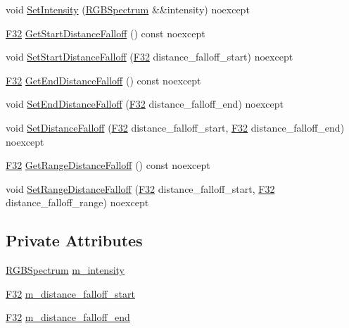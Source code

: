 \begin{DoxyCompactItemize}
void \hyperlink{structmage_1_1_scene_fog_aa953b6e08e2f6bcecfbb906959e876ea}{Set\+Intensity} (\hyperlink{structmage_1_1_r_g_b_spectrum}{R\+G\+B\+Spectrum} \&\&intensity) noexcept
\item 
\hyperlink{namespacemage_aa97e833b45f06d60a0a9c4fc22ae02c0}{F32} \hyperlink{structmage_1_1_scene_fog_a5cbed5d7f50485646d825289369bddfa}{Get\+Start\+Distance\+Falloff} () const noexcept
\item 
void \hyperlink{structmage_1_1_scene_fog_a0715b592a11b5705ad510cb6641cc5f6}{Set\+Start\+Distance\+Falloff} (\hyperlink{namespacemage_aa97e833b45f06d60a0a9c4fc22ae02c0}{F32} distance\+\_\+falloff\+\_\+start) noexcept
\item 
\hyperlink{namespacemage_aa97e833b45f06d60a0a9c4fc22ae02c0}{F32} \hyperlink{structmage_1_1_scene_fog_a312d19b9e3217c4aae6b9d2c831c860a}{Get\+End\+Distance\+Falloff} () const noexcept
\item 
void \hyperlink{structmage_1_1_scene_fog_a2e2923d38883d387e3c288d943aacd84}{Set\+End\+Distance\+Falloff} (\hyperlink{namespacemage_aa97e833b45f06d60a0a9c4fc22ae02c0}{F32} distance\+\_\+falloff\+\_\+end) noexcept
\item 
void \hyperlink{structmage_1_1_scene_fog_ae8db22af101cebabd670e37b3fb62662}{Set\+Distance\+Falloff} (\hyperlink{namespacemage_aa97e833b45f06d60a0a9c4fc22ae02c0}{F32} distance\+\_\+falloff\+\_\+start, \hyperlink{namespacemage_aa97e833b45f06d60a0a9c4fc22ae02c0}{F32} distance\+\_\+falloff\+\_\+end) noexcept
\item 
\hyperlink{namespacemage_aa97e833b45f06d60a0a9c4fc22ae02c0}{F32} \hyperlink{structmage_1_1_scene_fog_a8085b84b90e907751a0db99f9a26a3ef}{Get\+Range\+Distance\+Falloff} () const noexcept
\item 
void \hyperlink{structmage_1_1_scene_fog_acd555c5cbb592c2e78ae168bbb39da6c}{Set\+Range\+Distance\+Falloff} (\hyperlink{namespacemage_aa97e833b45f06d60a0a9c4fc22ae02c0}{F32} distance\+\_\+falloff\+\_\+start, \hyperlink{namespacemage_aa97e833b45f06d60a0a9c4fc22ae02c0}{F32} distance\+\_\+falloff\+\_\+range) noexcept
\end{DoxyCompactItemize}
\subsection*{Private Attributes}
\begin{DoxyCompactItemize}
\item 
\hyperlink{structmage_1_1_r_g_b_spectrum}{R\+G\+B\+Spectrum} \hyperlink{structmage_1_1_scene_fog_ad3758984c5a1941cd883dd82f8ebe975}{m\+\_\+intensity}
\item 
\hyperlink{namespacemage_aa97e833b45f06d60a0a9c4fc22ae02c0}{F32} \hyperlink{structmage_1_1_scene_fog_abe65f4142e63d52ce8894eefcae623bc}{m\+\_\+distance\+\_\+falloff\+\_\+start}
\item 
\hyperlink{namespacemage_aa97e833b45f06d60a0a9c4fc22ae02c0}{F32} \hyperlink{structmage_1_1_scene_fog_a8c17e984295aacba9f4226527f92e275}{m\+\_\+distance\+\_\+falloff\+\_\+end}
\end{DoxyCompactItemize}


